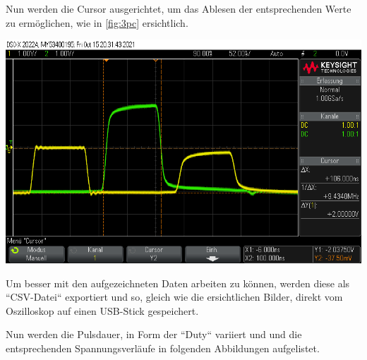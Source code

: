 \documentclass[11pt,ngerman]{scrartcl}
\begin{document}
\noindent Nun werden die Cursor ausgerichtet, um das Ablesen der entsprechenden Werte zu ermöglichen, wie in \autoref{fig:3pc} ersichtlich.

\begin{center}
	\begin{minipage}[t]{0.7\textwidth}
		\includegraphics[width=\textwidth]{oszi/scope_0_4}
		\label{fig:3pc}
	\end{minipage}
\end{center}

\noindent Um besser mit den aufgezeichneten Daten arbeiten zu können, werden diese als ``CSV-Datei`` exportiert und so, gleich wie die ersichtlichen Bilder, direkt vom Oszilloskop auf einen USB-Stick gespeichert.

\noindent Nun werden die Pulsdauer, in Form der ``Duty`` variiert und und die entsprechenden Spannungsverläufe in folgenden Abbildungen aufgelistet.
\end{document}
